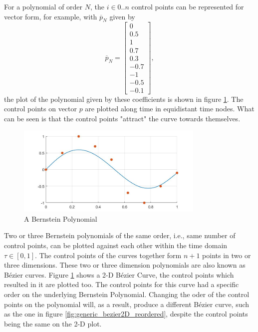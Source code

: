 \par For a polynomial of order $N$, the $i \in {0 .. n}$ control points can be represented for vector form, for example, with $\overline{p}_N$ given by 
\begin{equation}
    \overline{p}_N = \begin{bmatrix}0\\ 0.5\\ 1\\ 0.7\\ 0.3\\ -0.7\\ -1\\ -0.5\\ -0.1\end{bmatrix},
\end{equation}
the plot of the polynomial given by these coefficients is shown in figure \ref{fig:generic_bezier}. The control points on vector $p$ are plotted along time in equidistant time nodes. What can be seen is that the control points "attract" the curve towards themselves.

\begin{figure}[h!]
\centering
\includegraphics[width=0.8\textwidth]{Images/generic_bezier.jpg}
\caption{A Bernstein Polynomial}
\label{fig:generic_bezier}
\end{figure}

\par Two or three Bernstein polynomials of the same order, i.e., same number of control points, can be plotted against each other within the time domain $\tau \in [0,1]$. The control points of the curves together form $n+1$ points in two or three dimensions. These two or three dimension polynomials are also known as Bézier curves. Figure \ref{fig:generic_bezier} shows a 2-D Bézier Curve, the control points which resulted in it are plotted too. The control points for this curve had a specific order on the underlying Bernstein Polynomial. Changing the oder of the control points on the polynomial will, as a result, produce a different Bézier curve, such as the one in figure \ref{fig:generic_bezier2D_reordered}, despite the control points being the same on the 2-D plot.

